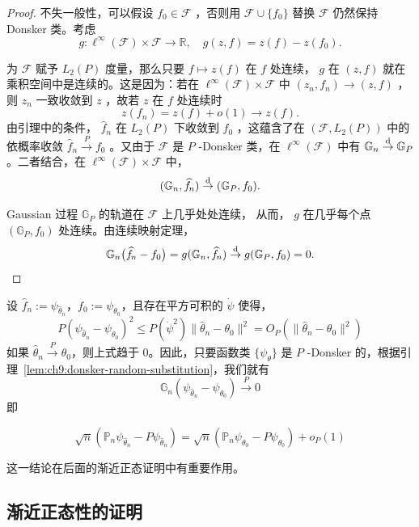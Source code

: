 \begin{proof}

不失一般性，可以假设 $f_0\in\mathscr F$ ，否则用 $\mathscr F\cup\{f_0\}$ 替换 $\mathscr F$ 仍然保持 Donsker 类。考虑
\[
g:\ell^\infty(\mathscr F)\times\mathscr F\to\mathbb R,\quad g(z,f)=z(f)-z(f_0).
\]

为 $\mathscr F$ 赋予 $L_2(P)$ 度量，那么只要 $f\mapsto z(f)$ 在 $f$ 处连续， $g$ 在 $(z,f)$ 就在乘积空间中是连续的。这是因为：若在 $\ell^\infty(\mathscr F)\times\mathscr F$ 中 $(z_n,f_n)\to (z,f)$ ，则 $z_n$ 一致收敛到 $z$ ，故若 $z$ 在 $f$ 处连续时
\[
z(f_n)=z(f)+o(1)\longrightarrow z(f).
\]
由引理中的条件， $\widehat f\!_n$ 在 $L_2(P)$ 下收敛到 $f_0$ ，这蕴含了在 $(\mathscr F,L_2(P))$ 中的依概率收敛 $\widehat f\!_n\overset P\to f_0$ 。又由于 $\mathscr F$ 是 $P$ -Donsker 类，在 $\ell^\infty(\mathscr F)$ 中有 $\mathbb G_n\overset{\rm d}\to \mathbb G_P$ 。二者结合，在 $\ell^\infty(\mathscr F)\times \mathscr F$ 中，
\[
(\mathbb G_n,\widehat f\!_n)\overset{\rm d}\to (\mathbb G_P,f_0).
\]

Gaussian 过程 $\mathbb G_P$ 的轨道在 $\mathscr F$ 上几乎处处连续， 从而， $g$ 在几乎每个点 $(\mathbb G_P,f_0)$ 处连续。由连续映射定理，
\[
\mathbb G_n\big(\widehat f\!_n-f_0\big)=g(\mathbb G_n,\widehat f\!_n)\overset{\rm d}\to g(\mathbb G_P,f_0)=0.
\]

\end{proof}

设 $\widehat{f}\!_n := \psi_{\widehat{\theta}_n}$，$f_0 := \psi_{\theta_0}$，且存在平方可积的 $\dot{\psi}$ 使得，\[P(\psi_{\widehat{\theta}_n} - \psi_{\theta_0})^2 \leq P(\dot{\psi}^2) \|\widehat{\theta}_n - \theta_0\|^2 = O_P(\|\widehat{\theta}_n - \theta_0\|^2)\]
如果 $\widehat{\theta}_n \overset{P}{\to} \theta_0$，则上式趋于 0。因此，只要函数类 $\{\psi_\theta\}$ 是 $P$ -Donsker 的，根据引理~\ref{lem:ch9:donsker-random-substitution}，我们就有\[\mathbb{G}_n(\psi_{\widehat{\theta}_n} - \psi_{\theta_0}) \overset{P}{\to} 0\]
即

\begin{equation}
\label{eq:ch9:tag-6}
\sqrt{n}(\mathbb{P}_n \psi_{\widehat{\theta}_n} - P\psi_{\widehat{\theta}_n}) = \sqrt{n}(\mathbb{P}_n \psi_{\theta_0} - P\psi_{\theta_0}) + o_P(1)
\end{equation}

这一结论在后面的渐近正态证明中有重要作用。

\subsection{渐近正态性的证明}

